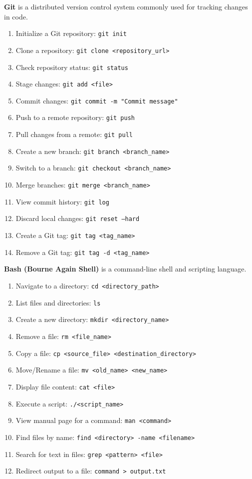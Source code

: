 \documentclass[9pt]{cheatsheet}
\begin{document}
\begin{multicols*}{3}

\textbf{Git} is a distributed version control system commonly used for tracking changes in code.

\begin{enumerate}
  \item Initialize a Git repository: \texttt{git init}
  \item Clone a repository: \texttt{git clone <repository\_url>}
  \item Check repository status: \texttt{git status}
  \item Stage changes: \texttt{git add <file>}
  \item Commit changes: \texttt{git commit -m "Commit message"}
  \item Push to a remote repository: \texttt{git push}
  \item Pull changes from a remote: \texttt{git pull}
  \item Create a new branch: \texttt{git branch <branch\_name>}
  \item Switch to a branch: \texttt{git checkout <branch\_name>}
  \item Merge branches: \texttt{git merge <branch\_name>}
  \item View commit history: \texttt{git log}
  \item Discard local changes: \texttt{git reset --hard}
  \item Create a Git tag: \texttt{git tag <tag\_name>}
  \item Remove a Git tag: \texttt{git tag -d <tag\_name>}
\end{enumerate}

\textbf{Bash (Bourne Again Shell)} is a command-line shell and scripting language.

\begin{enumerate}
  \item Navigate to a directory: \texttt{cd <directory\_path>}
  \item List files and directories: \texttt{ls}
  \item Create a new directory: \texttt{mkdir <directory\_name>}
  \item Remove a file: \texttt{rm <file\_name>}
  \item Copy a file: \texttt{cp <source\_file> <destination\_directory>}
  \item Move/Rename a file: \texttt{mv <old\_name> <new\_name>}
  \item Display file content: \texttt{cat <file>}
  \item Execute a script: \texttt{./<script\_name>}
  \item View manual page for a command: \texttt{man <command>}
  \item Find files by name: \texttt{find <directory> -name <filename>}
  \item Search for text in files: \texttt{grep <pattern> <file>}
  \item Redirect output to a file: \texttt{command > output.txt}
\end{enumerate}


\end{multicols*}
\end{document}

